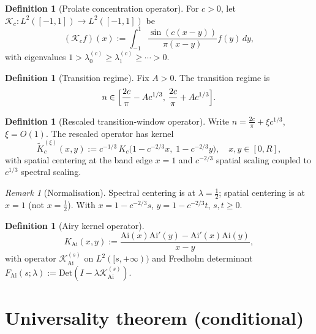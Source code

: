 \documentclass[12pt,a4paper]{amsart}
\theoremstyle{definition}
\newtheorem{definition}[theorem]{Definition}
\theoremstyle{remark}
\newtheorem{remark}[theorem]{Remark}
\newcommand{\Kc}{\mathcal{K}_c}
\newcommand{\Kairy}{\mathcal{K}_{\mathrm{Ai}}}
\newcommand{\lambdac}[2]{\lambda_{#2}^{(#1)}}
\newcommand{\Ai}{\mathrm{Ai}}
\newcommand{\Det}{\mathrm{Det}}
\begin{document}
\begin{definition}[Prolate concentration operator]
For $c>0$, let $\Kc:L^2([-1,1])\to L^2([-1,1])$ be
\[
  (\Kc f)(x) := \int_{-1}^1 \frac{\sin(c(x-y))}{\pi(x-y)} f(y)\,dy,
\]
with eigenvalues $1>\lambdac{c}{0}\ge\lambdac{c}{1}\ge\cdots>0$.
\end{definition}

\begin{definition}[Transition regime]
Fix $A>0$. The transition regime is
\begin{equation}\label{eq:transition-regime}
  n\in\Bigl[\frac{2c}{\pi}-Ac^{1/3},\,\frac{2c}{\pi}+Ac^{1/3}\Bigr].
\end{equation}
\end{definition}

\begin{definition}[Rescaled transition-window operator]
\label{def:rescaled-operator}
Write $n=\frac{2c}{\pi}+\xi c^{1/3}$, $\xi=O(1)$.
The rescaled operator has kernel
\[
  \widetilde K_c^{(\xi)}(x,y)
  := c^{-1/3}\,K_c\!\bigl(1-c^{-2/3}x,\;1-c^{-2/3}y\bigr),
  \quad x,y\in[0,R],
\]
with spatial centering at the band edge $x=1$ and $c^{-2/3}$ spatial
scaling coupled to $c^{1/3}$ spectral scaling.
\end{definition}

\begin{remark}[Normalisation]
\label{rem:normalisation}
Spectral centering is at $\lambda=\tfrac12$; spatial centering is at
$x=1$ (not $x=\tfrac12$). With $x=1-c^{-2/3}s$, $y=1-c^{-2/3}t$,
$s,t\ge 0$.
\end{remark}

\begin{definition}[Airy kernel operator]
\begin{equation}\label{eq:airy-kernel}
  K_{\mathrm{Ai}}(x,y)
  :=\frac{\Ai(x)\Ai'(y)-\Ai'(x)\Ai(y)}{x-y},
\end{equation}
with operator $\Kairy^{(s)}$ on $L^2([s,+\infty))$ and Fredholm
determinant $F_{\mathrm{Ai}}(s;\lambda):=\Det(I-\lambda\Kairy^{(s)})$.
\end{definition}

\section{Universality theorem (conditional)}
\label{sec:universality}
\end{document}
